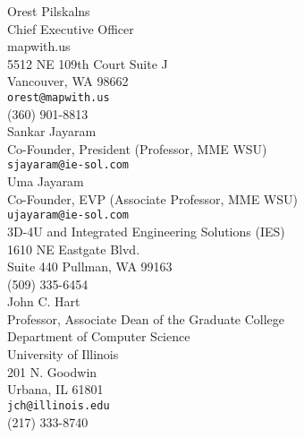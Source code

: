 \documentclass[10pt]{article}
\begin{document}
\pagebreak

Orest Pilskalns\\
Chief Executive Officer\\
mapwith.us\\
5512 NE 109th Court Suite J\\
Vancouver, WA 98662 \\
{\tt orest@mapwith.us} \\
(360) 901-8813\\

Sankar Jayaram\\  
Co-Founder, President (Professor, MME WSU)\\
{\tt sjayaram@ie-sol.com} \\
Uma Jayaram \\
Co-Founder, EVP (Associate Professor, MME WSU)\\
{\tt ujayaram@ie-sol.com} \\
3D-4U and Integrated Engineering Solutions (IES) \\
1610 NE Eastgate Blvd. \\
Suite 440 Pullman, WA 99163\\
(509) 335-6454\\

 
John C. Hart\\
Professor, Associate Dean of the Graduate College\\
Department of Computer Science\\
University of Illinois\\
201 N. Goodwin \\
Urbana, IL 61801 \\
{\tt jch@illinois.edu} \\
(217) 333-8740 \\


\end{document}

